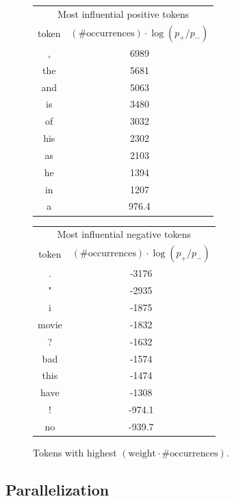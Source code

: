 \documentclass{article}
\begin{document}
\begin{figure}
\begin{tabular}{c|c}
    \multicolumn{2}{c}{Most influential positive tokens} \\
    token & \((\# \mathrm{occurrences}) \cdot \log(p_+ / p_-)\) \\
    \hline
     , & 6989 \\
    the & 5681 \\
    and & 5063 \\
    is & 3480 \\
    of & 3032 \\
    his & 2302 \\
    as & 2103 \\
    he & 1394 \\
    in & 1207 \\
    a & 976.4
\end{tabular}
\begin{tabular}{c|c}
    \multicolumn{2}{c}{Most influential negative tokens} \\
    token & \((\# \mathrm{occurrences}) \cdot \log(p_+ / p_-)\) \\
    \hline
    . & -3176 \\
    " & -2935 \\
    i & -1875 \\
    movie & -1832 \\
    ? & -1632 \\
    bad & -1574 \\
    this & -1474 \\
    have & -1308 \\
    ! & -974.1 \\
    no & -939.7
\end{tabular}
\caption{Tokens with highest \((\mathrm{weight} \cdot \# \mathrm{occurrences})\).}
\end{figure}


\subsection{Parallelization}





\end{document}
